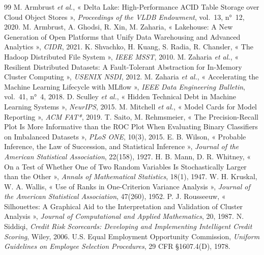 \documentclass[11pt,a4paper]{article}
\begin{document}
\begin{thebibliography}{99}
\small
{} M. Armbrust \emph{et al.}, « Delta Lake: High-Performance ACID Table Storage over Cloud Object Stores »,
  \emph{Proceedings of the VLDB Endowment}, vol.~13, n°~12, 2020.
 M. Armbrust, A. Ghodsi, R. Xin, M. Zaharia, « Lakehouse: A New Generation of Open Platforms that Unify Data
  Warehousing and Advanced Analytics », \emph{CIDR}, 2021.
 K. Shvachko, H. Kuang, S. Radia, R. Chansler, « The Hadoop Distributed File System », \emph{IEEE MSST}, 2010.
 M. Zaharia \emph{et al.}, « Resilient Distributed Datasets: A Fault-Tolerant Abstraction for In-Memory Cluster
  Computing », \emph{USENIX NSDI}, 2012.
 M. Zaharia \emph{et al.}, « Accelerating the Machine Learning Lifecycle with MLflow », \emph{IEEE Data
  Engineering Bulletin}, vol.~41, n°~4, 2018.
 D. Sculley \emph{et al.}, « Hidden Technical Debt in Machine Learning Systems », \emph{NeurIPS}, 2015.
 M. Mitchell \emph{et al.}, « Model Cards for Model Reporting », \emph{ACM FAT*}, 2019.
 T. Saito, M. Rehmsmeier, « The Precision-Recall Plot Is More Informative than the ROC Plot When Evaluating
  Binary Classifiers on Imbalanced Datasets », \emph{PLoS ONE}, 10(3), 2015.
 E. B. Wilson, « Probable Inference, the Law of Succession, and Statistical Inference », \emph{Journal of the
  American Statistical Association}, 22(158), 1927.
 H. B. Mann, D. R. Whitney, « On a Test of Whether One of Two Random Variables Is Stochastically Larger than the
  Other », \emph{Annals of Mathematical Statistics}, 18(1), 1947.
 W. H. Kruskal, W. A. Wallis, « Use of Ranks in One-Criterion Variance Analysis », \emph{Journal of the American
  Statistical Association}, 47(260), 1952.
 P. J. Rousseeuw, « Silhouettes: A Graphical Aid to the Interpretation and Validation of Cluster Analysis »,
  \emph{Journal of Computational and Applied Mathematics}, 20, 1987.
 N. Siddiqi, \emph{Credit Risk Scorecards: Developing and Implementing Intelligent Credit Scoring}, Wiley, 2006.
 U.S. Equal Employment Opportunity Commission, \emph{Uniform Guidelines on Employee Selection Procedures},
  29 CFR §1607.4(D), 1978.
\end{thebibliography}
\end{document}
